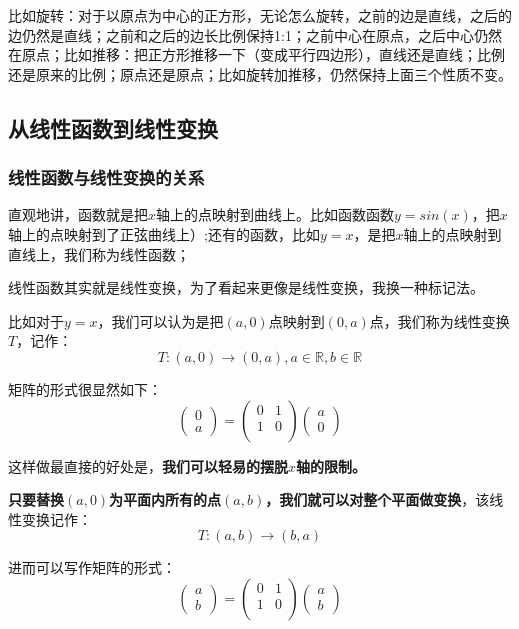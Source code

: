 \documentclass[12pt]{article}
\begin{document}
比如旋转：对于以原点为中心的正方形，无论怎么旋转，之前的边是直线，之后的边仍然是直线；之前和之后的边长比例保持1:1；之前中心在原点，之后中心仍然在原点；比如推移：把正方形推移一下（变成平行四边形），直线还是直线；比例还是原来的比例；原点还是原点；比如旋转加推移，仍然保持上面三个性质不变。

\subsection{从线性函数到线性变换}
\subsubsection{线性函数与线性变换的关系}
直观地讲，函数就是把$x$轴上的点映射到曲线上。比如函数函数$y=sin(x)$，把$x$轴上的点映射到了正弦曲线上）;还有的函数，比如$y=x$，是把$x$轴上的点映射到直线上，我们称为线性函数；

线性函数其实就是线性变换，为了看起来更像是线性变换，我换一种标记法。

比如对于$y=x$，我们可以认为是把$(a,0)$点映射到$(0,a)$点，我们称为线性变换$T$，记作：
$$
T:(a,0) \rightarrow (0,a), a \in \mathbb{R}, b \in \mathbb{R}
$$

矩阵的形式很显然如下：
$$
\begin{pmatrix}
0 \\ a
\end{pmatrix}
= \begin{pmatrix}
0 & 1 \\1 & 0 \\
\end{pmatrix}
\begin{pmatrix}
a \\ 0
\end{pmatrix}
$$

这样做最直接的好处是，\textbf{我们可以轻易的摆脱$x$轴的限制。}

\textbf{只要替换$(a,0)$为平面内所有的点$(a,b)$，我们就可以对整个平面做变换}，该线性变换记作：
$$
T:(a,b) \rightarrow (b,a)
$$

进而可以写作矩阵的形式：
$$
\begin{pmatrix}
a \\ b
\end{pmatrix}
= \begin{pmatrix}
0 & 1 \\1 & 0 \\
\end{pmatrix}
\begin{pmatrix}
a \\ b
\end{pmatrix}
$$
\end{document}
